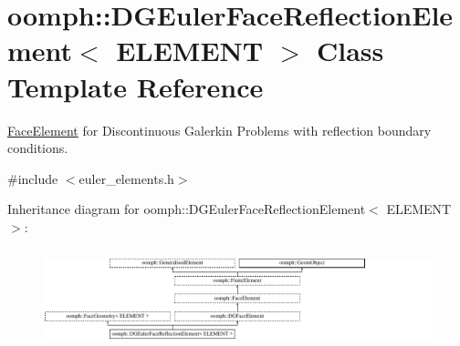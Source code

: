 \hypertarget{classoomph_1_1DGEulerFaceReflectionElement}{}\section{oomph\+:\+:D\+G\+Euler\+Face\+Reflection\+Element$<$ E\+L\+E\+M\+E\+NT $>$ Class Template Reference}
\label{classoomph_1_1DGEulerFaceReflectionElement}


\hyperlink{classoomph_1_1FaceElement}{Face\+Element} for Discontinuous Galerkin Problems with reflection boundary conditions.  




{\ttfamily \#include $<$euler\+\_\+elements.\+h$>$}

Inheritance diagram for oomph\+:\+:D\+G\+Euler\+Face\+Reflection\+Element$<$ E\+L\+E\+M\+E\+NT $>$\+:\begin{figure}[H]
\begin{center}
\leavevmode
\includegraphics[height=2.898551cm]{classoomph_1_1DGEulerFaceReflectionElement}
\end{center}
\end{figure}
